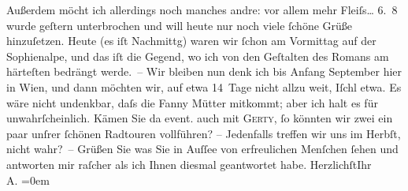 \begin{ledgroupsized}[t]{13cm}
               Außerdem {\pb}möcht ich allerdings noch manches andre: vor
               allem mehr Fleiſs{\dots}\pend
           \pstart
           \raggedleft{}6. 8\pend
           \pstart
           wurde geſtern unterbrochen und will heute nur noch viele ſchöne Grüße hinzuſetzen.
               Heute (es iſt Nachmittg) waren wir ſchon am Vormittag auf
               der Sophienalpe, und das iſt die Gegend, wo ich von
               den Geſtalten des Romans am
               härteſten bedrängt werde. –\pend
           \pstart
           Wir bleiben nun denk ich bis Anfang September hier in Wien, und dann möchten wir, auf etwa 14 Tage nicht allzu weit,
                  Iſchl etwa. Es {\pb}wäre
               nicht undenkbar, daſs die Fanny Mütter mitkommt;
               aber ich halt es für unwahrſcheinlich. Kämen Sie da{\geminationn}
               event. auch mit \textsc{Gerty}, ſo könnten wir zwei ein paar unſrer ſchönen Radtouren vollführen? – Jedenfalls
               treffen wir uns im Herbſt, nicht wahr? –\pend
           \pstart
           Grüßen Sie was Sie in Auſſee von erfreulichen
               Menſchen ſehen und antworten mir raſcher als ich Ihnen diesmal geantwortet habe.\pend
           \pstart
           Herzlichſt\hspace*{1.5em}Ihr{\\[\baselineskip]}\spacefill\mbox{A.}\pend
           \leftskip=0em{}          \endnumbering{}\end{ledgroupsized}  \newcommand{\dateiname}{L01422}\newcommand{\titel}{Arthur Schnitzler an Hugo von Hofmannsthal, 5.–6. 8. 1904}\newcommand{\editorInnen}{Martin Anton Müller und Gerd-Hermann Susen}
            \footnotesize
\begin{ledgroupsized}[t]{11.5cm}
\end{ledgroupsized}
         
      